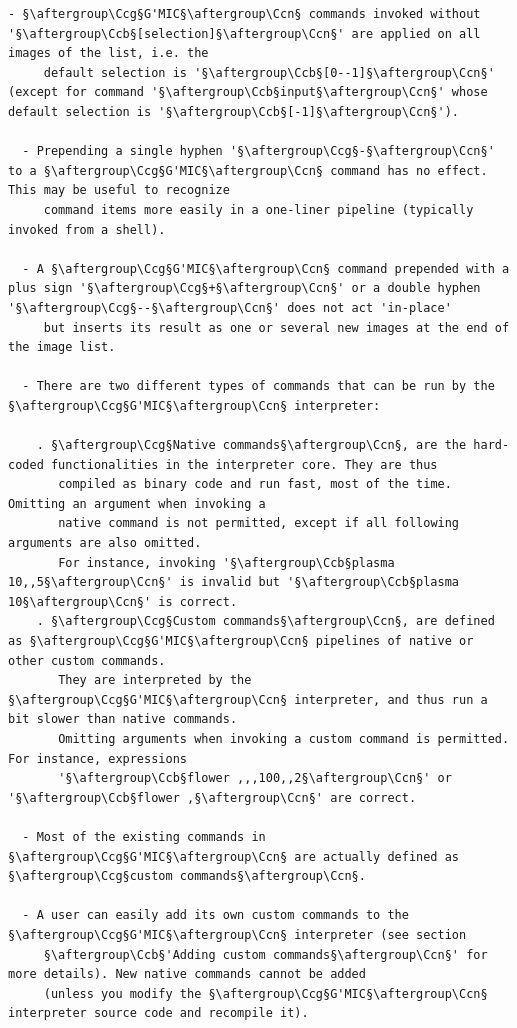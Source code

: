 \documentclass[a4paper,10.5pt,twoside]{book}
\def\Ccb{\color{cb}}
\def\Ccg{\color{cc}}
\def\Ccn{\color{black}}
\begin{document}
\begin{lstlisting}[escapechar=§]
  - §\aftergroup\Ccg§G'MIC§\aftergroup\Ccn§ commands invoked without '§\aftergroup\Ccb§[selection]§\aftergroup\Ccn§' are applied on all images of the list, i.e. the 
     default selection is '§\aftergroup\Ccb§[0--1]§\aftergroup\Ccn§' (except for command '§\aftergroup\Ccb§input§\aftergroup\Ccn§' whose default selection is '§\aftergroup\Ccb§[-1]§\aftergroup\Ccn§'). 
 
  - Prepending a single hyphen '§\aftergroup\Ccg§-§\aftergroup\Ccn§' to a §\aftergroup\Ccg§G'MIC§\aftergroup\Ccn§ command has no effect. This may be useful to recognize 
     command items more easily in a one-liner pipeline (typically invoked from a shell). 
 
  - A §\aftergroup\Ccg§G'MIC§\aftergroup\Ccn§ command prepended with a plus sign '§\aftergroup\Ccg§+§\aftergroup\Ccn§' or a double hyphen '§\aftergroup\Ccg§--§\aftergroup\Ccn§' does not act 'in-place' 
     but inserts its result as one or several new images at the end of the image list. 
 
  - There are two different types of commands that can be run by the §\aftergroup\Ccg§G'MIC§\aftergroup\Ccn§ interpreter: 
 
    . §\aftergroup\Ccg§Native commands§\aftergroup\Ccn§, are the hard-coded functionalities in the interpreter core. They are thus 
       compiled as binary code and run fast, most of the time. Omitting an argument when invoking a 
       native command is not permitted, except if all following arguments are also omitted. 
       For instance, invoking '§\aftergroup\Ccb§plasma 10,,5§\aftergroup\Ccn§' is invalid but '§\aftergroup\Ccb§plasma 10§\aftergroup\Ccn§' is correct. 
    . §\aftergroup\Ccg§Custom commands§\aftergroup\Ccn§, are defined as §\aftergroup\Ccg§G'MIC§\aftergroup\Ccn§ pipelines of native or other custom commands. 
       They are interpreted by the §\aftergroup\Ccg§G'MIC§\aftergroup\Ccn§ interpreter, and thus run a bit slower than native commands. 
       Omitting arguments when invoking a custom command is permitted. For instance, expressions 
       '§\aftergroup\Ccb§flower ,,,100,,2§\aftergroup\Ccn§' or '§\aftergroup\Ccb§flower ,§\aftergroup\Ccn§' are correct. 
 
  - Most of the existing commands in §\aftergroup\Ccg§G'MIC§\aftergroup\Ccn§ are actually defined as §\aftergroup\Ccg§custom commands§\aftergroup\Ccn§. 
 
  - A user can easily add its own custom commands to the §\aftergroup\Ccg§G'MIC§\aftergroup\Ccn§ interpreter (see section 
     §\aftergroup\Ccb§'Adding custom commands§\aftergroup\Ccn§' for more details). New native commands cannot be added 
     (unless you modify the §\aftergroup\Ccg§G'MIC§\aftergroup\Ccn§ interpreter source code and recompile it).
\end{lstlisting}
\end{document}
